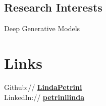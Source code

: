 \documentclass[a4paper]{deedy-resume} %
\begin{document}
\begin{minipage}[t]{0.33\textwidth} %


%
%
%
%
%
%
%
%
%

\sectionspace
\subsection{Research Interests} 

Deep Generative Models \\
 
\section{Links} 

Github:// \href{https://github.com/LindaPetrini}{\bf LindaPetrini} \\
LinkedIn:// \href{https://www.linkedin.com/in/petrinilinda}{\bf petrinilinda} \\


\end{minipage}
\end{document}
